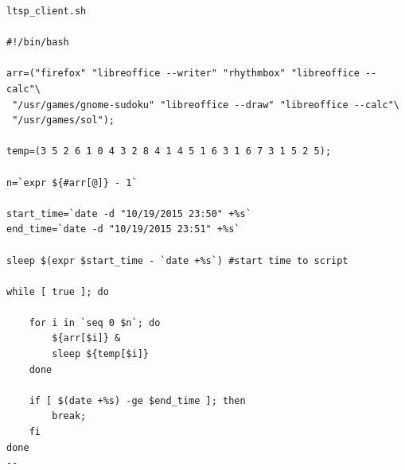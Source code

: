 \documentclass[
	12pt,				%
	openright,			%
	twoside,			%
	a4paper,			%
	chapter=TITLE,		%
	english,			%
	brazil				%
	]{abntex2}
\begin{document}
\begin{apendicesenv}
\begin{verbatim}
ltsp_client.sh

#!/bin/bash

arr=("firefox" "libreoffice --writer" "rhythmbox" "libreoffice --calc"\
 "/usr/games/gnome-sudoku" "libreoffice --draw" "libreoffice --calc"\
 "/usr/games/sol"); 

temp=(3 5 2 6 1 0 4 3 2 8 4 1 4 5 1 6 3 1 6 7 3 1 5 2 5);

n=`expr ${#arr[@]} - 1`

start_time=`date -d "10/19/2015 23:50" +%s`
end_time=`date -d "10/19/2015 23:51" +%s`

sleep $(expr $start_time - `date +%s`) #start time to script

while [ true ]; do
	
	for i in `seq 0 $n`; do
		${arr[$i]} &
		sleep ${temp[$i]}
	done

	if [ $(date +%s) -ge $end_time ]; then
		break;
	fi
done
--
\end{verbatim}




\end{apendicesenv}







\phantompart
\printindex
\end{document}
